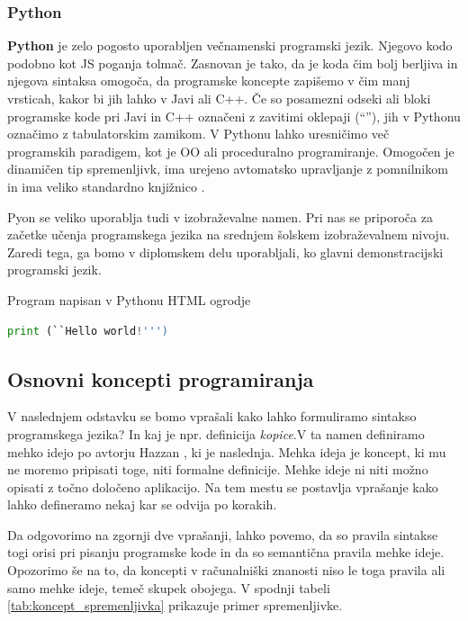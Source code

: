 \subsubsection{Python}
\label{sec:pj_python}

\textbf{Python} je zelo pogosto uporabljen večnamenski programski
jezik. Njegovo kodo podobno kot JS poganja tolmač. Zasnovan je tako,
da je koda čim bolj berljiva in njegova sintaksa omogoča, da
programske koncepte zapišemo v čim manj vrsticah, kakor bi jih lahko v
Javi ali C++. Če so posamezni odseki ali bloki programske kode pri
Javi in C++ označeni z zavitimi oklepaji (``{}''), jih v Pythonu
označimo z tabulatorskim zamikom. V Pythonu lahko uresničimo več
programskih paradigem, kot je OO ali proceduralno
programiranje. Omogočen je dinamičen tip spremenljivk, ima urejeno
avtomatsko upravljanje z pomnilnikom in ima veliko standardno
knjižnico \cite{wiki:python}.

Pyon se veliko uporablja tudi v izobraževalne namen. Pri nas se
priporoča za začetke učenja programskega jezika na srednjem šolskem
izobraževalnem nivoju. Zaredi tega, ga bomo v diplomskem delu
uporabljali, ko glavni demonstracijski programski jezik.

\begin{examplebox}[label={prog:py01}]{Program napisan v Pythonu
    HTML ogrodje}
\begin{lstlisting}[language=Python]
print (``Hello world!''')
\end{lstlisting}
\end{examplebox}

\subsection{Osnovni koncepti programiranja}
\label{sec:Osnvni koncepti_programiranja}

V naslednjem odstavku se bomo vprašali kako lahko formuliramo sintakso
programskega jezika? In kaj je npr. definicija \emph{kopice}.V ta
namen definiramo mehko idejo po avtorju Hazzan \cite{guideTCS}, ki je
naslednja. Mehka ideja je koncept, ki mu ne moremo pripisati toge,
niti formalne definicije. Mehke ideje ni niti možno opisati z točno
določeno aplikacijo. Na tem mestu se postavlja vprašanje kako lahko
defineramo nekaj kar se odvija po korakih.

Da odgovorimo na zgornji dve vprašanji, lahko povemo, da so pravila
sintakse togi orisi pri pisanju programske kode in da so semantična
pravila mehke ideje. Opozorimo še na to, da koncepti v računalniški
znanosti niso le toga pravila ali samo mehke ideje, temeč skupek
obojega. V spodnji tabeli \ref{tab:koncept_spremenljivka} prikazuje
primer spremenljivke.

